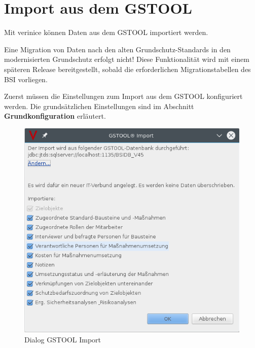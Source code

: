 \documentclass[a4paper,10pt]{book}
\begin{document}
\section{Import aus dem GSTOOL} \label{Import aus dem GSTOOL}
Mit verinice können Daten aus dem \textsc{GSTOOL} importiert werden.

Eine Migration von Daten nach den alten Grundschutz-Standards in den
modernisierten Grundschutz erfolgt nicht! Diese Funktionalität wird mit einem
späteren Release bereitgestellt, sobald die erforderlichen Migrationstabellen
des BSI vorliegen.

Zuerst müssen die Einstellungen zum Import aus dem \textsc{GSTOOL} konfiguriert werden. Die grund\-sätzlichen Einstellungen sind im Abschnitt \textbf{Grundkonfiguration} erläutert.

\begin{figure}[htb!]
  \centering
  \includegraphics[scale=.5]{Screenshot/gstool-import-dialog_de.png}
  \caption{\label{Dialog GSTOOL Import} Dialog GSTOOL Import}
\end{figure}
\end{document}
